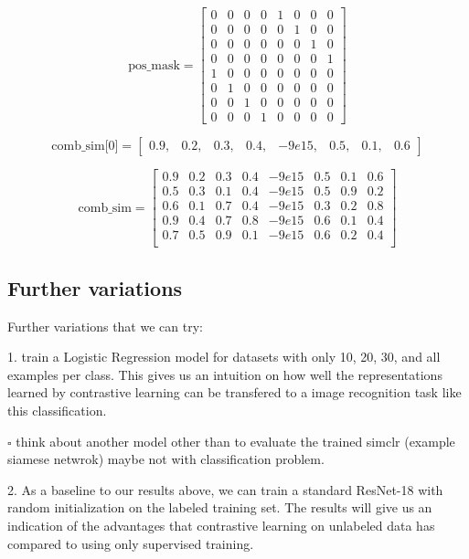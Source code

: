 \documentclass[12pt,twoside,a4paper,parskip]{scrbook} %
\begin{document}
\[
\text{pos\_mask} = \begin{bmatrix} 
0 & 0 & 0 & 0 & 1 & 0 & 0 & 0 \\
0 & 0 & 0 & 0 & 0 & 1 & 0 & 0 \\ 
0 & 0 & 0 & 0 & 0 & 0 & 1 & 0 \\ 
0 & 0 & 0 & 0 & 0 & 0 & 0 & 1 \\ 
1 & 0 & 0 & 0 & 0 & 0 & 0 & 0 \\ 
0 & 1 & 0 & 0 & 0 & 0 & 0 & 0 \\ 
0 & 0 & 1 & 0 & 0 & 0 & 0 & 0 \\ 
0 & 0 & 0 & 1 & 0 & 0 & 0 & 0 
\end{bmatrix}
\]

\[
\text{comb\_sim[0]} = \begin{bmatrix} 
0.9, & 0.2, & 0.3, & 0.4, & -9e15, & 0.5, & 0.1, & 0.6
\end{bmatrix}
\]

\[
\text{comb\_sim} = \begin{bmatrix} 
0.9 & 0.2 & 0.3 & 0.4 & -9e15 & 0.5 & 0.1 & 0.6 \\ 
0.5 & 0.3 & 0.1 & 0.4 & -9e15 & 0.5 & 0.9 & 0.2 \\ 
0.6 & 0.1 & 0.7 & 0.4 & -9e15 & 0.3 & 0.2 & 0.8 \\ 
0.9 & 0.4 & 0.7 & 0.8 & -9e15 & 0.6 & 0.1 & 0.4 \\ 
0.7 & 0.5 & 0.9 & 0.1 & -9e15 & 0.6 & 0.2 & 0.4 \\ 
\end{bmatrix}
\]



\subsection{Further variations}
Further variations that we can try: 

1. train a Logistic Regression model for datasets with only 10, 20, 30, and all  examples per class. This gives us an intuition on how well the representations learned by contrastive learning can be transfered to a image recognition task like this classification.

$\square$ think about another model other than to evaluate the trained simclr (example siamese netwrok) maybe not with classification problem.

2. As a baseline to our results above, we can train a standard ResNet-18 with random initialization on the labeled training set. The results will give us an indication of the advantages that contrastive learning on unlabeled data has compared to using only supervised training.
\end{document}
